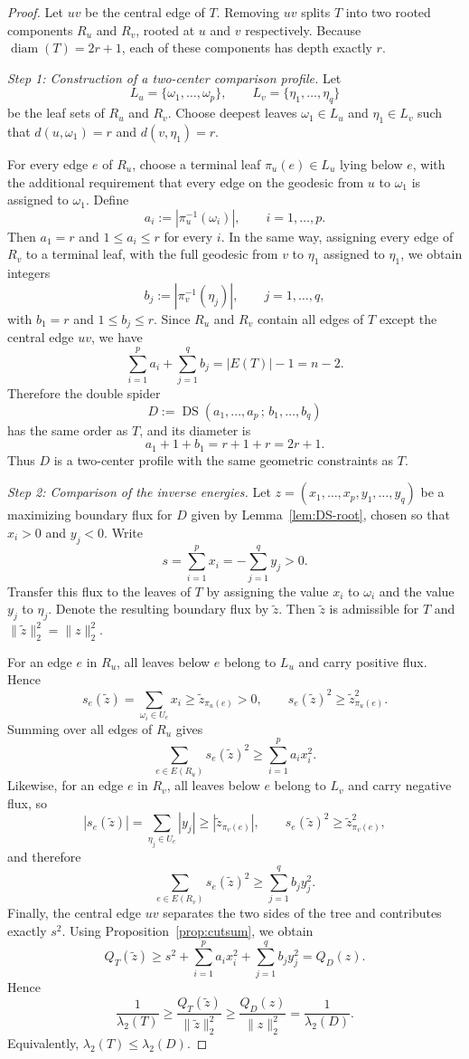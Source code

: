 \documentclass[11pt]{article}
\theoremstyle{remark}
\newcommand{\diam}{\operatorname{diam}}
\newcommand{\DS}{\operatorname{DS}}
\begin{document}
\begin{proof}
Let $uv$ be the central edge of $T$. Removing $uv$ splits $T$ into two rooted components
$R_u$ and $R_v$, rooted at $u$ and $v$ respectively. Because $\diam(T)=2r+1$, each of these
components has depth exactly $r$.

\smallskip
\noindent\emph{Step 1: Construction of a two-center comparison profile.}
Let
$$
L_u=\{\omega_1,\dots,\omega_p\},
\qquad
L_v=\{\eta_1,\dots,\eta_q\}
$$
be the leaf sets of $R_u$ and $R_v$. Choose deepest leaves $\omega_1\in L_u$ and
$\eta_1\in L_v$ such that $d(u,\omega_1)=r$ and $d(v,\eta_1)=r$.

For every edge $e$ of $R_u$, choose a terminal leaf $\pi_u(e)\in L_u$ lying below $e$, with the
additional requirement that every edge on the geodesic from $u$ to $\omega_1$ is assigned to
$\omega_1$. Define
$$
a_i:=|\pi_u^{-1}(\omega_i)|,
\qquad i=1,\dots,p.
$$
Then $a_1=r$ and $1\le a_i\le r$ for every $i$. In the same way, assigning every edge of $R_v$
to a terminal leaf, with the full geodesic from $v$ to $\eta_1$ assigned to $\eta_1$, we obtain
integers
$$
b_j:=|\pi_v^{-1}(\eta_j)|,
\qquad j=1,\dots,q,
$$
with $b_1=r$ and $1\le b_j\le r$. Since $R_u$ and $R_v$ contain all edges of $T$ except the
central edge $uv$, we have
$$
\sum_{i=1}^p a_i+\sum_{j=1}^q b_j=|E(T)|-1=n-2.
$$
Therefore the double spider
$$
D:=\DS(a_1,\dots,a_p\,;\,b_1,\dots,b_q)
$$
has the same order as $T$, and its diameter is
$$
a_1+1+b_1=r+1+r=2r+1.
$$
Thus $D$ is a two-center profile with the same geometric constraints as $T$.

\smallskip
\noindent\emph{Step 2: Comparison of the inverse energies.}
Let $z=(x_1,\dots,x_p,y_1,\dots,y_q)$ be a maximizing boundary flux for $D$ given by
Lemma~\ref{lem:DS-root}, chosen so that $x_i>0$ and $y_j<0$. Write
$$
s=\sum_{i=1}^p x_i=-\sum_{j=1}^q y_j>0.
$$
Transfer this flux to the leaves of $T$ by assigning the value $x_i$ to $\omega_i$ and the value
$y_j$ to $\eta_j$. Denote the resulting boundary flux by $\widetilde z$. Then $\widetilde z$ is admissible
for $T$ and $\|\widetilde z\|_2^2=\|z\|_2^2$.

For an edge $e$ in $R_u$, all leaves below $e$ belong to $L_u$ and carry positive flux. Hence
$$
s_e(\widetilde z)=\sum_{\omega_i\in U_e}x_i\ge \widetilde z_{\pi_u(e)}>0,
\qquad
s_e(\widetilde z)^2\ge \widetilde z_{\pi_u(e)}^2.
$$
Summing over all edges of $R_u$ gives
$$
\sum_{e\in E(R_u)} s_e(\widetilde z)^2\ge \sum_{i=1}^p a_i x_i^2.
$$
Likewise, for an edge $e$ in $R_v$, all leaves below $e$ belong to $L_v$ and carry negative flux, so
$$
|s_e(\widetilde z)|=\sum_{\eta_j\in U_e}|y_j|\ge |\widetilde z_{\pi_v(e)}|,
\qquad
s_e(\widetilde z)^2\ge \widetilde z_{\pi_v(e)}^2,
$$
and therefore
$$
\sum_{e\in E(R_v)} s_e(\widetilde z)^2\ge \sum_{j=1}^q b_j y_j^2.
$$
Finally, the central edge $uv$ separates the two sides of the tree and contributes exactly $s^2$.
Using Proposition~\ref{prop:cutsum}, we obtain
$$
Q_T(\widetilde z)
\ge
s^2+\sum_{i=1}^p a_i x_i^2+\sum_{j=1}^q b_j y_j^2
=
Q_D(z).
$$
Hence
$$
\frac1{\lambda_2(T)}
\ge
\frac{Q_T(\widetilde z)}{\|\widetilde z\|_2^2}
\ge
\frac{Q_D(z)}{\|z\|_2^2}
=
\frac1{\lambda_2(D)}.
$$
Equivalently, $\lambda_2(T)\le \lambda_2(D)$.


\end{proof}
\end{document}
